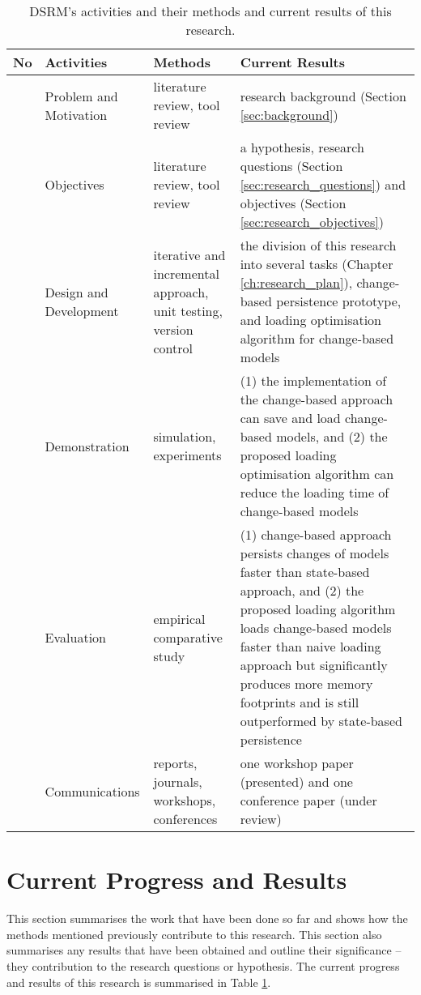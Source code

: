 \documentclass[12pt, a4paper]{report} \usepackage[titletoc]{appendix}
\begin{document}
\begin{table}[h]
    \centering
    \caption{DSRM's activities and their methods and current results of this research.}
    \label{table:research_progress}
    \begin{tabular}
        {|>{\centering\arraybackslash}p{0.6cm}|>{\centering\arraybackslash}p{3cm}|>{\centering\arraybackslash}p{3.1cm}|>{\centering\arraybackslash}p{6.5cm}|}
        \hline 
        \textbf{No}&\textbf{Activities}&\textbf{Methods}&\textbf{Current Results}\\
        \hline 
        1 & Problem and Motivation &literature review, tool review & research background (Section \ref{sec:background})\\
        \hline 
        2 & Objectives & literature review, tool review & a hypothesis, research questions (Section \ref{sec:research_questions}) and objectives  (Section \ref{sec:research_objectives})\\
        \hline 
        3 & Design and Development & iterative and incremental approach, unit testing, version control & the division of this research into several tasks (Chapter \ref{ch:research_plan}), change-based persistence prototype, and loading optimisation algorithm for change-based models\\
        \hline 
        4 & Demonstration & simulation, experiments  & (1) the implementation of the change-based approach can save and load change-based models, and (2) the proposed loading optimisation algorithm can reduce the loading time of change-based models \\
        \hline 
        5 & Evaluation & empirical comparative study & (1) change-based approach persists changes of models faster than state-based approach, and (2) the proposed loading algorithm loads change-based models faster than naive loading approach but significantly produces more memory footprints and is still outperformed by state-based persistence\\
        \hline 
        6 & Communications & reports, journals, workshops, conferences & one workshop paper (presented) and one conference paper (under review)\\
        \hline 
\end{tabular} 
\end{table}
        

\section{Current Progress and Results}
\label{sec:current_progress_and_results}
This section summarises the work that have been done so far and shows how the methods mentioned previously contribute to this research. This section also summarises any results that have been obtained and outline their significance -- they contribution to the research questions or hypothesis. The current progress and results of this research is summarised in Table \ref{table:research_progress}.
\end{document}
